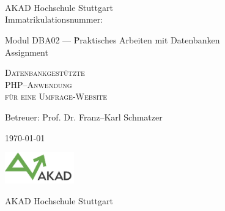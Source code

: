 

\begin{titlepage}


\vspace{5cm}

\Name \\ 
\Strasse \\ 
\PlzOrt\\ 
\href{mailto:\Email}{\Email}

AKAD Hochschule Stuttgart\\
Immatrikulationsnummer: \Immatrikulationsnummer

\vfill

\begin{tabbing}
Modul DBA02 --- \=Praktisches Arbeiten mit Datenbanken\\ 
                \>Assignment  
\end{tabbing}
\LARGE
\textsc{Datenbankgestützte \\PHP--Anwendung\\für eine Umfrage-Website}\\

\vfill

\normalsize

Betreuer: Prof. Dr. Franz--Karl Schmatzer

\today %

\vfill

\includegraphics[width=3cm]{akad_logo.png}

AKAD Hochschule Stuttgart

\end{titlepage}



\normalsize
